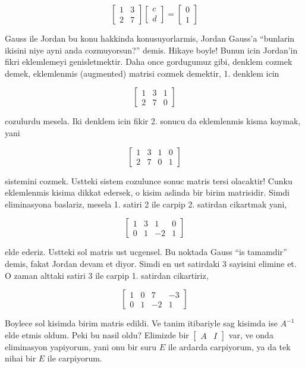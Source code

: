 \documentclass[12pt,fleqn]{article}\usepackage{../common}
\begin{document}
$$ 
\left[\begin{array}{rrr}
1 & 3 \\
2 & 7
\end{array}\right]
\left[\begin{array}{r}
c  \\
d 
\end{array}\right]
=
\left[\begin{array}{rrr}
0  \\
1
\end{array}\right]
 $$

Gauss ile Jordan bu konu hakkinda konusuyorlarmis, Jordan Gauss'a
``bunlarin ikisini niye ayni anda cozmuyorsun?'' demis. Hikaye boyle! Bunun
icin Jordan'in fikri eklemlemeyi genisletmektir. Daha once gordugumuz gibi,
denklem cozmek demek, eklemlenmis (augmented) matrisi cozmek demektir,
1. denklem icin 

$$ 
\left[\begin{array}{rr|r}
1 & 3 & 1\\
2 & 7 & 0
\end{array}\right]
 $$

cozulurdu mesela. Iki denklem icin fikir 2. sonucu da eklemlenmis kisma
koymak, yani 
        
$$ 
\left[\begin{array}{rr|rr}
1 & 3 & 1 & 0\\
2 & 7 & 0 & 1
\end{array}\right]
 $$

sistemini cozmek. Ustteki sistem cozulunce sonuc matris tersi olacaktir!
Cunku eklemlenmis kisima dikkat edersek, o kisim aslinda bir birim
matrisidir. Simdi eliminasyona baslariz, mesela 1. satiri 2 ile carpip
2. satirdan cikartmak yani,

        
$$ 
\left[\begin{array}{rr|rr}
1 & 3 & 1 & 0\\
0 & 1 & -2 & 1
\end{array}\right]
 $$

elde ederiz. Ustteki sol matris ust ucgensel. Bu noktada Gauss ``is
tamamdir'' demis, fakat Jordan devam et diyor. Simdi en ust satirdaki 3
sayisini elimine et. O zaman alttaki satiri 3 ile carpip 1. satirdan
cikartiriz,

$$ 
\left[\begin{array}{rr|rr}
1 & 0 & 7 & -3\\
0 & 1 & -2 & 1
\end{array}\right]
 $$

Boylece sol kisimda birim matris edildi. Ve tanim itibariyle sag kisimda
ise $A^{-1}$ elde etmis oldum. Peki bu nasil oldu? Elimizde bir
$\left[\begin{array}{r|r}A & I\end{array}\right]$ var, ve onda eliminasyon yapiyorum, yani onu bir suru $E$ ile ardarda 
carpiyorum, ya da tek nihai bir $E$ ile carpiyorum. 
\end{document}
